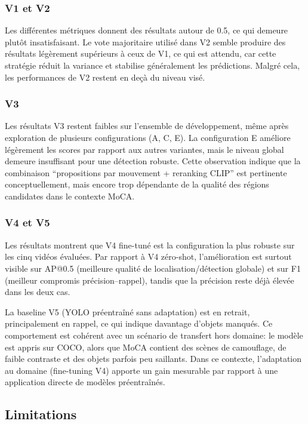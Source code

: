 \documentclass{article}
\begin{document}
\subsubsection{V1 et V2}
Les différentes métriques donnent des résultats autour de 0.5, ce qui demeure plutôt insatisfaisant. Le vote majoritaire utilisé dans V2 semble produire des résultats légèrement supérieurs à ceux de V1, ce qui est attendu, car cette stratégie réduit la variance et stabilise généralement les prédictions. Malgré cela, les performances de V2 restent en deçà du niveau visé.

\subsubsection{V3}
Les résultats V3 restent faibles sur l’ensemble de développement, même après exploration de plusieurs configurations (A, C, E). La configuration E améliore légèrement les scores par rapport aux autres variantes, mais le niveau global demeure insuffisant pour une détection robuste. Cette observation indique que la combinaison ``propositions par mouvement + reranking CLIP'' est pertinente conceptuellement, mais encore trop dépendante de la qualité des régions candidates dans le contexte MoCA.

\subsubsection{V4 et V5}
Les résultats montrent que V4 fine-tuné est la configuration la plus robuste sur les cinq vidéos évaluées. Par rapport à V4 zéro-shot, l’amélioration est surtout visible sur AP@0.5 (meilleure qualité de localisation/détection globale) et sur F1 (meilleur compromis précision--rappel), tandis que la précision reste déjà élevée dans les deux cas.

La baseline V5 (YOLO préentraîné sans adaptation) est en retrait, principalement en rappel, ce qui indique davantage d’objets manqués. Ce comportement est cohérent avec un scénario de transfert hors domaine: le modèle est appris sur COCO, alors que MoCA contient des scènes de camouflage, de faible contraste et des objets parfois peu saillants. Dans ce contexte, l’adaptation au domaine (fine-tuning V4) apporte un gain mesurable par rapport à une application directe de modèles préentraînés.

\subsection{Limitations}
\end{document}
